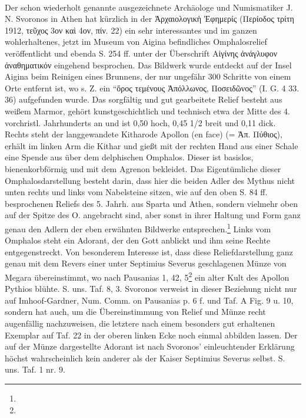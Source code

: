\documentclass[a4paper, 11pt, oneside]{article}
\begin{document}
\paragraph{}
Der schon wiederholt genannte ausgezeichnete Archäologe und Numismatiker J. N. Svoronos in Athen hat kürzlich in der Ἀρχαιολογικὴ Ἐφημερίς (Περίοδος τρίτη 1912, τεῦχος 3ον καὶ 4ον, πίν. 22) ein sehr interessantes und im ganzen wohlerhaltenes, jetzt im Museum von Aigina befindliches Omphalosrelief veröffentlicht und ebenda S. 254 ff. unter der Überschrift Αἰγίνης ἀνάγλυφον ἀναθηματικόν eingehend besprochen. Das Bildwerk wurde entdeckt auf der Insel Aigina beim Reinigen eines Brunnens, der nur ungefähr 300 Schritte von einem Orte entfernt ist, wo s. Z. ein "`ὅρος τεμένους Ἀπόλλωνος, Ποσειδῶνος"' (I. G. 4 33. 36) aufgefunden wurde. Das sorgfältig und gut gearbeitete Relief besteht aus weißem Marmor, gehört kunstgeschichtlich und technisch etwa der Mitte des 4. vorchristl. Jahrhunderts an und ist 0,50 hoch, 0,45 1/2 breit und 0,11 dick. Rechts steht der langgewandete Kitharode Apollon (en face) (= Ἀπ. Πύθιος), erhält im linken Arm die Kithar und gießt mit der rechten Hand aus einer Schale eine Spende aus über dem delphischen Omphalos. Dieser ist basislos, bienenkorbförmig und mit dem Agrenon bekleidet. Das Eigentümliche dieser Omphalosdarstellung besteht darin, dass hier die beiden Adler des Mythus nicht unten rechts und links vom Nabelsteine sitzen, wie auf den oben S. 84 ff. besprochenen Reliefs des 5. Jahrh. aus Sparta und Athen, sondern vielmehr oben auf der Spitze des O. angebracht sind, aber sonst in ihrer Haltung und Form ganz genau den Adlern der eben erwähnten Bildwerke entsprechen.\footnote{} Links vom Omphalos steht ein Adorant, der den Gott anblickt und ihm seine Rechte entgegenstreckt. Von besonderem Interesse ist, dass diese Reliefdarstellung ganz genau mit dem Revers einer unter Septimius Severus geschlagenen Münze von Megara übereinstimmt, wo nach Pausanias 1, 42, 5\footnote{} ein alter Kult des Apollon Pythios blühte. S. uns. Taf. 8, 3. Svoronos verweist in dieser Beziehung nicht nur auf Imhoof-Gardner, Num. Comm. on Pausanias p. 6 f. und Taf. A Fig. 9 u. 10, sondern hat auch, um die Übereinstimmung von Relief und Münze recht augenfällig nachzuweisen, die letztere nach einem besonders gut erhaltenen Exemplar auf Taf. 22 in der oberen linken Ecke noch einmal abbilden lassen. Der auf der Münze dargestellte Adorant ist nach Svoronos' einleuchtender Erklärung höchst wahrscheinlich kein anderer als der Kaiser Septimius Severus selbst. S. uns. Taf. 1 nr. 9.
\end{document}
